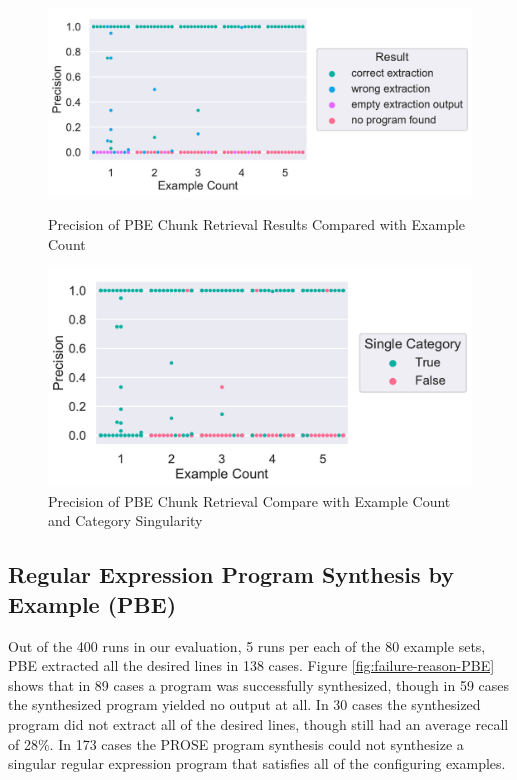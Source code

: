 \documentclass[\myrootdir/main.tex]{subfiles}
\begin{document}
\begin{figure}[htbp]
	\centering
	\begin{minipage}{0.45\textwidth}
		\centering
		\includegraphics[width=\textwidth, clip]{img/big-study/precision-extraction-result-PBE.pdf}
		\caption{Precision of PBE Chunk Retrieval Results Compared with Example Count}
		\label{fig:precision-extraction-result-PBE}
	\end{minipage}\hfill
	\begin{minipage}{0.45\textwidth}
		\centering
		\includegraphics[width=\textwidth, clip]{img/big-study/precision-singlecategory-swarm-PBE.pdf}
		\caption{Precision of PBE Chunk Retrieval Compare with Example Count and Category Singularity}
		\label{fig:precision-singlecategory-swarm-PBE}
	\end{minipage}
\end{figure}
\subsection{Regular Expression Program Synthesis by Example (PBE)}
Out of the 400 runs in our evaluation, 5 runs per each of the 80 example sets, PBE extracted all the desired lines in 138 cases.
Figure \ref{fig:failure-reason-PBE} shows that in 89 cases a program was successfully synthesized, though in 59 cases the synthesized program yielded no output at all.
In 30 cases the synthesized program did not extract all of the desired lines, though still had an average recall of 28\%.
In 173 cases the PROSE program synthesis could not synthesize a singular regular expression program that satisfies all of the configuring examples.
\end{document}
